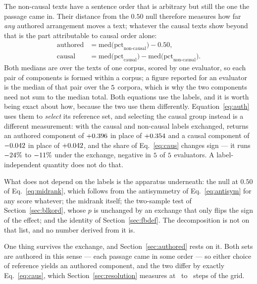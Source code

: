 \documentclass[11pt]{article}
\begin{document}
The non-causal texts have a sentence order that is arbitrary but still the
one the passage came in.  Their distance from the $0.50$ null therefore measures
how far \emph{any} authored arrangement moves a text; whatever the causal texts show
beyond that is the part attributable to causal order alone:
\begin{align}
\text{authored} &= \mathrm{med}\big(\mathrm{pct}_{\text{non-causal}}\big) - 0.50,
\label{eq:auth}\\
\text{causal}   &= \mathrm{med}\big(\mathrm{pct}_{\text{causal}}\big)
                 - \mathrm{med}\big(\mathrm{pct}_{\text{non-causal}}\big).
\label{eq:caus}
\end{align}
Both medians are over the texts of one corpus, scored by one evaluator, so
each pair of components is formed within a corpus; a figure reported for an
evaluator is the median of that pair over the $5$ corpora, which is why
the two components need not sum to the median total.  Both equations use the labels, and it is worth being exact about how,
because the two use them differently.
Equation~\eqref{eq:auth} uses them to \emph{select} its reference set, and
selecting the causal group instead is a different measurement: with the
causal and non-causal labels exchanged, \texttt{\SwapEval} returns an authored component of
$+0.396$ in place of $+0.354$ and a causal component of
$-0.042$ in place of $+0.042$, and the share of
Eq.~\eqref{eq:caus} changes sign --- it runs $-24\%$ to
$-11\%$ under the exchange, negative in $5$ of
$5$ evaluators.  A label-independent quantity does not do
that.

What does not depend on the labels is the apparatus underneath: the null at
$0.50$ of Eq.~\eqref{eq:midrank}, which follows from the antisymmetry of
Eq.~\eqref{eq:antisym} for any score whatever; the midrank itself; the
two-sample test of Section~\ref{sec:blkord}, whose $p$ is unchanged by an
exchange that only flips the sign of the effect; and the identity of
Section~\ref{sec:fbdef}.  The decomposition is not on that list, and no
number derived from it is.

One thing survives the exchange, and Section~\ref{sec:authored} rests on
it.  Both sets are authored in this sense --- each passage came in
some order --- so either choice of reference yields an authored component, and the two
differ by exactly Eq.~\eqref{eq:caus}, which
Section~\ref{sec:resolution} measures at \CausalCompStepsMin\ to
\CausalCompStepsMax\ steps of the grid.
\end{document}
